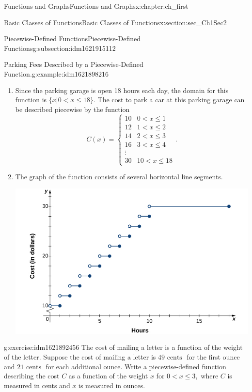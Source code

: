 \documentclass[oneside,10pt,]{book}
\numberwithin{equation}{section}
\newcommand{\lt}{<}
\newcommand{\amp}{&}
\begin{document}
\begin{chapterptx}{Functions and Graphs}{}{Functions and Graphs}{}{}{x:chapter:ch_first}
\begin{sectionptx}{Basic Classes of Functions}{}{Basic Classes of Functions}{}{}{x:section:sec_Ch1Sec2}
\begin{subsectionptx}{Piecewise-Defined Functions}{}{Piecewise-Defined Functions}{}{}{g:subsection:idm1621915112}
\begin{example}{Parking Fees Described by a Piecewise-Defined Function.}{g:example:idm1621898216}
\begin{enumerate}
\item{}Since the parking garage is open 18 hours each day, the domain for this function is \(\{x| 0 \lt x\leq   18 \}.\) The cost to park a car at this parking garage can be described piecewise by the function%
\begin{equation*}
C(x)=\begin{cases} 10 \amp 0 \lt x\leq   1 \\ 12 \amp 1 \lt x\leq   2 \\ 14 \amp 2 \lt x\leq   3 \\ 16 \amp 3 \lt x\leq   4 \\ \vdots \\ 30 \amp 10 \lt x\leq   18 \end{cases}.
\end{equation*}
%
\item{}The graph of the function consists of several horizontal line segments. \begin{image}{0.25}{0.5}{0.25}%
\includegraphics[width=\linewidth]{external/CNX_Calc_Figure_01_02_013.jpg}
\end{image}%
%
\end{enumerate}
\end{example}
\begin{inlineexercise}{}{g:exercise:idm1621892456}%
The cost of mailing a letter is a function of the weight of the letter. Suppose the cost of mailing a letter is \(49 \text{ cents }\) for the first ounce and \(21 \text{ cents }\) for each additional ounce. Write a piecewise-defined function describing the cost \(C\) as a function of the weight \(x\) for \(0 \lt x\leq   3 ,\) where \(C\) is measured in cents and \(x\) is measured in ounces.%
\par\smallskip%

\end{inlineexercise}
\end{subsectionptx}
\end{sectionptx}
\end{chapterptx}
\end{document}
